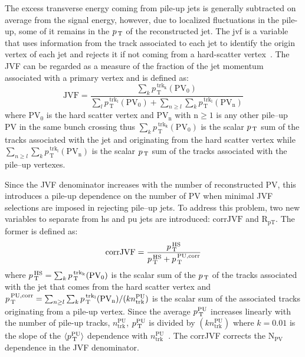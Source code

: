 The excess transverse energy coming from pile-up jets is generally subtracted on
average from the signal energy, however, due to localized fluctuations in the
pile-up, some of it remains in the $p_\mathrm{\, T}$ of the reconstructed jet. The \gls{jvf}
is a variable that uses information from the track associated to each jet to
identify the origin vertex of each jet and rejects it if not coming from a
hard-scatter vertex~\cite{JVF}. The JVF can be regarded as a measure of the
fraction of the jet momentum associated with a primary vertex and is defined as:
\begin{equation}
  \label{eq:77}
  \mathrm{JVF} = \frac{\sum_k p_\mathrm{\, T}^\mathrm{\, trk_k}
    (\mathrm{PV_0})}{\sum_l p_\mathrm{\, T}^\mathrm{\, trk_l} (\mathrm{PV_0}) +
    \sum_{n \geq l} \sum_k p_\mathrm{\, T}^\mathrm{\, trk_l} (\mathrm{PV_n})}
\end{equation}
where PV$_0$ is the hard scatter vertex and PV$_\mathrm{n}$ with
$\mathrm{n} \geq 1$ is any other pile--up PV in the same bunch crossing thus
$\sum_k p_\mathrm{\, T}^\mathrm{\, trk_k} (\mathrm{PV_0})$ is the scalar $p_\mathrm{\, T}$
sum of the tracks associated with the jet and originating from the hard scatter
vertex while
$\sum_{n \geq l} \sum_k p_\mathrm{\, T}^\mathrm{\, trk_l} (\mathrm{PV_n})$ is
the scalar $p_\mathrm{\, T}$ sum of the tracks associated with the pile--up vertexes.

Since the JVF denominator increases with the number of reconstructed PV, this
introduces a pile-up dependence on the number of PV when minimal JVF selections
are imposed in rejecting pile--up jets. To address this problem, two new
variables to separate from \gls{hs} and \gls{pu} jets are introduced:
$\mathrm{corrJVF}$ and $\mathrm{R_{pT}}$. The former is defined as:
\begin{equation}
  \label{eq:78}
  \mathrm{corrJVF} = \frac{p_\mathrm{\, T}^{\mathrm{\, HS}}}{p_\mathrm{\, T}^{\, \mathrm{HS}} +
    p_\mathrm{\, T}^{\, \mathrm{PU, corr}}}
\end{equation}
where
$p_\mathrm{\, T}^{\mathrm{\, HS}} = \sum_k p_\mathrm{\, T}^\mathrm{\, trk_k}
(\mathrm{PV_0})$
is the scalar sum of the $p_\mathrm{\, T}$ of the tracks associated with the jet that comes
from the hard scatter vertex and
$p_\mathrm{\, T}^{\, \mathrm{PU, corr}} = \sum_{n \geq l} \sum_k p_\mathrm{\, T}^\mathrm{\,
  trk_l} (\mathrm{PV_n}) / (k n_{\mathrm{trk}}^{\mathrm{PU}})$
is the scalar sum of the associated tracks originating from a pile-up
vertex. Since the average $p_\mathrm{\, T}^{\mathrm{PU}}$ increases linearly with the number
of pile-up tracks, $n_{\mathrm{trk}}^{\mathrm{PU}}$, $p_\mathrm{\, T}^{\mathrm{PU}}$ is
divided by $(kn_{\mathrm{trk}}^{\mathrm{PU}})$ where $k = 0.01$ is the slope of
the $\langle p_\mathrm{\, T}^{\mathrm{PU}} \rangle$ dependence with
$n_{\mathrm{trk}}^{\mathrm{PU}}$~\cite{JVT}. The corrJVF corrects the
N$_\mathrm{PV}$ dependence in the JVF denominator.

